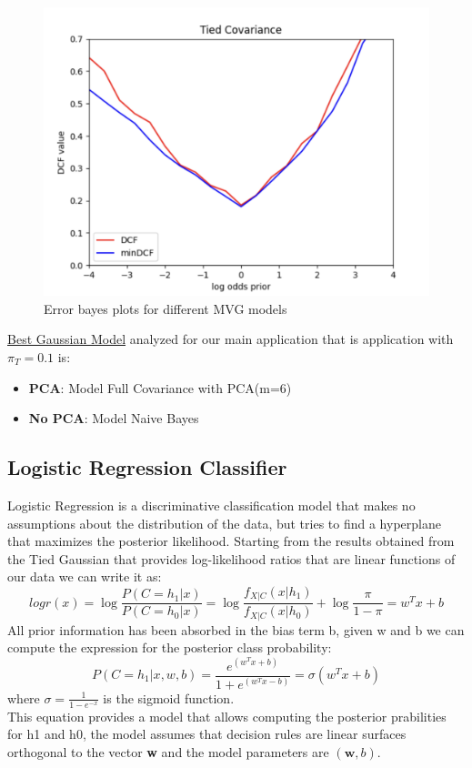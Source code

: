 \documentclass{article}
\begin{document}
\begin{figure}[H]
\begin{minipage}{.3\textwidth}
        \includegraphics[width=\linewidth]{./img/tied.png}
    \end{minipage}
    \caption{Error bayes plots for different MVG models} %
    \label{fig:models_comparison} %
\end{figure}
\underline{Best Gaussian Model} analyzed for our main application that is application with \(\pi_T=0.1\) is:
\begin{itemize}
    \item \textbf{PCA}: Model Full Covariance with PCA(m=6)
    \item \textbf{No PCA}: Model Naive Bayes 
\end{itemize}
\subsection{Logistic Regression Classifier}
Logistic Regression is a discriminative classification model that makes no assumptions about the distribution of the data, but tries to find a hyperplane that maximizes the posterior likelihood. 
Starting from the results obtained from the Tied Gaussian that provides log-likelihood ratios that are linear functions of our data we can write it as:
\begin{equation}
    log{r(x)} =\log{\frac{P(C=h_1|x)}{P(C=h_0|x)}}=\log{\frac{f_{X|C}(x|h_1)}{f_{X|C}(x|h_0)}}+\log{\frac{\pi}{1-\pi}}= w^Tx + b
\end{equation}
All prior information has been absorbed in the bias term b, given w and b we can compute the expression for the posterior class probability:
\begin{equation}
    P(C=h_1|x,w,b)=\frac{e^{(w^Tx+b)}}{1+e^{(w^Tx-b)}}=\sigma(w^Tx+b)
\end{equation}
where \(\sigma=\frac{1}{1-e^{-x}}\) is the sigmoid function.\\
This equation provides a model that allows computing the posterior prabilities for h1 and h0, the model assumes that decision rules are linear surfaces orthogonal to the vector \textbf{w} and the model parameters are \((\textbf{w},b)\).
\end{document}
